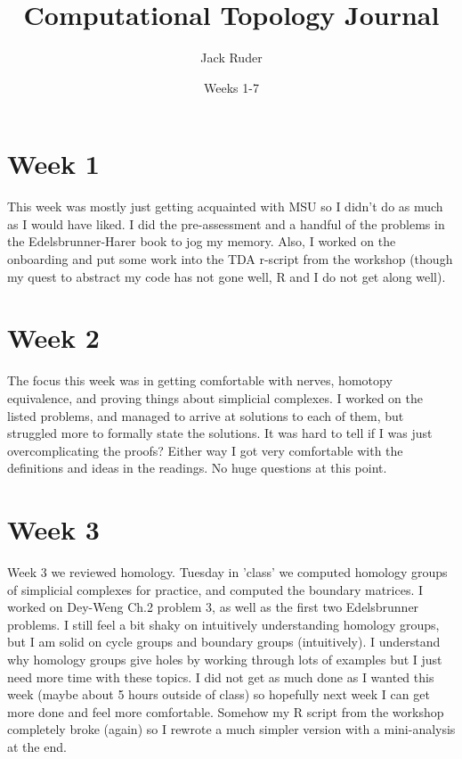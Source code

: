 \documentclass[a4paper]{article}
\title{Computational Topology Journal}
\date{Weeks 1-7}
\author{Jack Ruder}
\begin{document}
\doublespacing
\maketitle
\section{Week 1}
This week was mostly just getting acquainted with MSU so I didn't do as much as I would have liked. I did the pre-assessment and a handful of the problems in the Edelsbrunner-Harer book to jog my memory. Also, I worked on the onboarding and put some work into the TDA r-script from the workshop (though my quest to abstract my code has not gone well, R and I do not get along well).

\section{Week 2}
The focus this week was in getting comfortable with nerves, homotopy equivalence, and proving things about simplicial complexes. I worked on the listed problems, and managed to arrive at solutions to each of them, but struggled more to formally state the solutions. It was hard to tell if I was just overcomplicating the proofs? Either way I got very comfortable with the definitions and ideas in the readings. No huge questions at this point.

\section{Week 3}
Week 3 we reviewed homology. Tuesday in 'class' we computed homology groups of simplicial complexes for practice, and computed the boundary matrices. I worked on Dey-Weng Ch.2 problem 3, as well as the first two Edelsbrunner problems. I still feel a bit shaky on intuitively understanding homology groups, but I am solid on cycle groups and boundary groups (intuitively). I understand why homology groups give holes by working through lots of examples but I just need more time with these topics. I did not get as much done as I wanted this week (maybe about 5 hours outside of class) so hopefully next week I can get more done and feel more comfortable.
Somehow my R script from the workshop completely broke (again) so I rewrote a much simpler version with a mini-analysis at the end.
\end{document}
